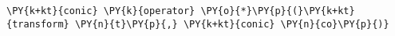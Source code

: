 \begin{Verbatim}[commandchars=\\\{\}]
    \PY{k+kt}{conic} \PY{k}{operator} \PY{o}{*}\PY{p}{(}\PY{k+kt}{transform} \PY{n}{t}\PY{p}{,} \PY{k+kt}{conic} \PY{n}{co}\PY{p}{)}
\end{Verbatim}
